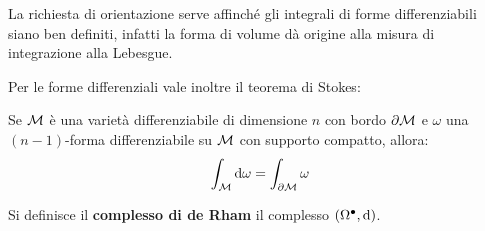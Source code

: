 \begin{osservation}
  La richiesta di orientazione serve affinché gli integrali di forme differenziabili
  siano ben definiti, infatti la forma di volume dà origine alla misura di integrazione
  alla Lebesgue.
\end{osservation}
Per le forme differenziali vale inoltre il teorema di Stokes:
\begin{theorem}
  Se $ \mathcal{M} $ è una varietà differenziabile di dimensione $ n $ con bordo $ \partial \mathcal{M} $
  e $ \omega $ una $ (n-1) $-forma differenziabile su $ \mathcal{M} $ con supporto compatto, allora:
  \[
    \int_{\mathcal{M}} \operatorname{d}\!{\omega} = \int_{\partial \mathcal{M}} \omega
  \]
\end{theorem}
\begin{definition}
  Si definisce il \textbf{complesso di de Rham}
  il complesso $ (\Omega^\bullet, \operatorname{d}\!{}) $.
\end{definition}
